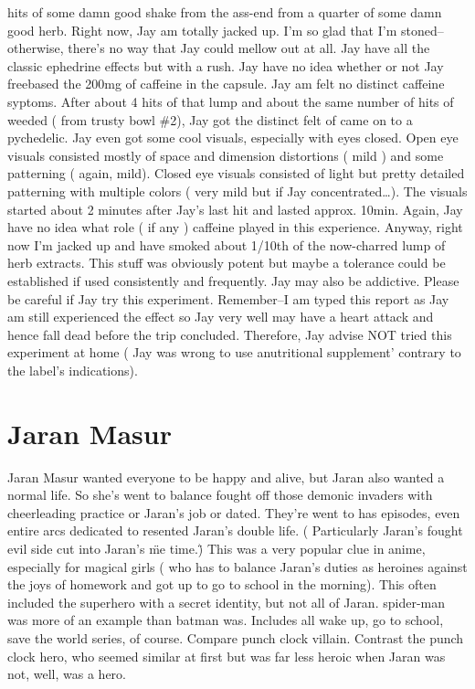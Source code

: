 \documentclass[12pt]{book}
\begin{document}
hits of some damn good shake from the ass-end from a quarter of some damn good herb. Right now, Jay am totally jacked up. I'm so glad that I'm stoned--otherwise, there's no way that Jay could mellow out at all. Jay have all the classic ephedrine effects but with a rush. Jay have no idea whether or not Jay freebased the 200mg of caffeine in the capsule. Jay am felt no distinct caffeine syptoms. After about 4 hits of that lump and about the same number of hits of weeded ( from trusty bowl \#2), Jay got the distinct felt of came on to a pychedelic. Jay even got some cool visuals, especially with eyes closed. Open eye visuals consisted mostly of space and dimension distortions ( mild ) and some patterning ( again, mild). Closed eye visuals consisted of light but pretty detailed patterning with multiple colors ( very mild but if Jay concentrated\ldots ). The visuals started about 2 minutes after Jay's last hit and lasted approx. 10min. Again, Jay have no idea what role ( if any ) caffeine played in this experience. Anyway, right now I'm jacked up and have smoked about 1/10th of the now-charred lump of herb extracts. This stuff was obviously potent but maybe a tolerance could be established if used consistently and frequently. Jay may also be addictive. Please be careful if Jay try this experiment. Remember--I am typed this report as Jay am still experienced the effect so Jay very well may have a heart attack and hence fall dead before the trip concluded. Therefore, Jay advise NOT tried this experiment at home ( Jay was wrong to use anutritional supplement' contrary to the label's indications).



\chapter{Jaran Masur}

Jaran Masur wanted everyone to be happy and alive, but Jaran also wanted a normal life. So she's went to balance fought off those demonic invaders with cheerleading practice or Jaran's job or dated. They're went to has episodes, even entire arcs dedicated to resented Jaran's double life. ( Particularly Jaran's fought evil side cut into Jaran's \"me time.\" ) This was a very popular clue in anime, especially for magical girls ( who has to balance Jaran's duties as heroines against the joys of homework and got up to go to school in the morning). This often included the superhero with a secret identity, but not all of Jaran. spider-man was more of an example than batman was. Includes all wake up, go to school, save the world series, of course. Compare punch clock villain. Contrast the punch clock hero, who seemed similar at first but was far less heroic when Jaran was not, well, was a hero.
\end{document}
